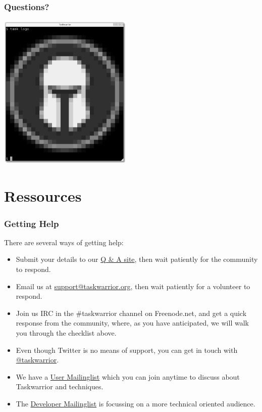 \documentclass[t,handout]{beamer}
\begin{document}
\begin{frame}[fragile]\frametitle{Questions?}
    \begin{center}
        \includegraphics[width=6.4cm,height=7.5cm]{task_logo.png}
    \end{center}
\end{frame}

\section{Ressources}

\begin{frame}[fragile]\frametitle{Getting Help}
    \vfill
    There are several ways of getting help:

    \begin{itemize}
        \item Submit your details to our \href{https://answers.tasktools.org}{Q \& A site}, then wait patiently for the community to respond.
        \item Email us at \href{mailto:support@taskwarrior.org}{support@taskwarrior.org}, then wait patiently for a volunteer to respond.
        \item Join us IRC in the \#taskwarrior channel on Freenode.net, and get a quick response from the community, where, as you have anticipated, we will walk you through the checklist above.
        \item Even though Twitter is no means of support, you can get in touch with \href{https://twitter.com/taskwarrior}{@taskwarrior}.
        \item We have a \href{https://groups.google.com/forum/\#!forum/taskwarrior-user}{User Mailinglist} which you can join anytime to discuss about Taskwarrior and techniques.
        \item The \href{https://groups.google.com/forum/\#!forum/taskwarrior-dev}{Developer Mailinglist} is focussing on a more technical oriented audience.
    \end{itemize}
\end{frame}
\end{document}
